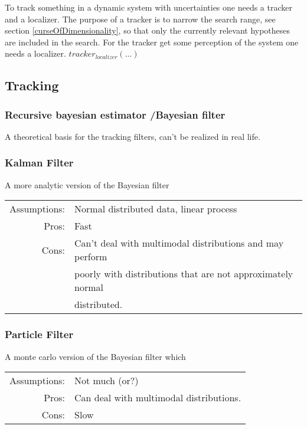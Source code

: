 
To track something in a dynamic system with uncertainties one needs a tracker and a localizer. The purpose of a tracker is to narrow the search range, see section \ref{curseOfDimensionality}, so that only the currently relevant hypotheses are included in the search. For the tracker get some perception of the system one needs a localizer. $tracker_{localizer}(...)$


\subsection{Tracking}
\subsubsection*{Recursive bayesian estimator /Bayesian filter}
A theoretical basis for the tracking filters, can't be realized in real life.
\subsubsection{Kalman Filter}
A more analytic version of the Bayesian filter

\begin{tabular}[h]{rl}
Assumptions: & Normal distributed data, linear process\\ %
Pros: & Fast\\
Cons: & Can't deal with multimodal distributions and may perform\\
& poorly with distributions that are not approximately normal\\
& distributed.
\end{tabular}

\subsubsection*{Particle Filter}
A monte carlo version of the Bayesian filter which 

\begin{tabular}[h]{rl}
  Assumptions: & Not much (or?)\\
  Pros: & Can deal with multimodal distributions.\\
  Cons: & Slow
\end{tabular}

